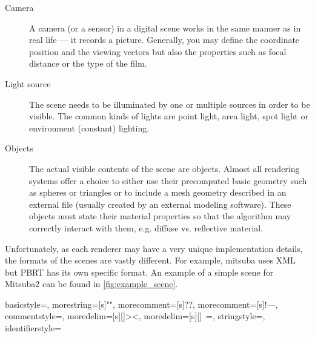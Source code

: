 \begin{description}
	\item[Camera] A camera (or a sensor) in a digital scene works in the same manner as in real life --- it records a picture. Generally, you may define the coordinate position and the viewing vectors but also the properties such as focal distance or the type of the film.
	\item[Light source] The scene needs to be illuminated by one or multiple sources in order to be visible. The common kinds of lights are point light, area light, spot light or environment (constant) lighting. 
	\item[Objects] The actual visible contents of the scene are objects. Almost all rendering systems offer a choice to either use their precomputed basic geometry such as spheres or triangles or to include a mesh geometry described in an external file (usually created by an external modeling software). These objects must state their material properties so that the algorithm may correctly interact with them, e.g. diffuse vs. reflective material.
\end{description}

Unfortunately, as each renderer may have a very unique implementation details, the formats of the scenes are vastly different. For example, mitsuba uses XML but PBRT has its own specific format. An example of a simple scene for Mitsuba2 can be found in \autoref{fig:example_scene}.

{
	basicstyle=\ttfamily,
	morestring=[s]{"}{"},
	morecomment=[s]{?}{?},
	morecomment=[s]{!--}{--},
	commentstyle=\color{darkgreen},
	moredelim=[s][\color{black}]{>}{<},
	moredelim=[s][\color{red}]{\ }{=},
	stringstyle=\color{blue},
	identifierstyle=\color{maroon}
}

